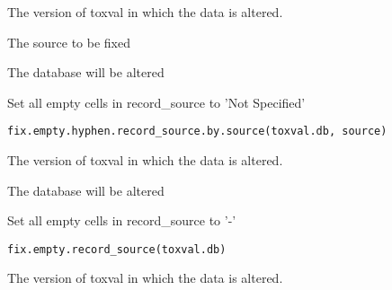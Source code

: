 \documentclass[letterpaper]{book}
\begin{document}
%
\begin{Arguments}
\begin{ldescription}
\item[\code{toxval.db}] The version of toxval in which the data is altered.

\item[\code{source}] The source to be fixed
\end{ldescription}
\end{Arguments}
%
\begin{Value}
The database will be altered
\end{Value}
%
\begin{Description}\relax
Set all empty cells in record\_source to 'Not Specified'
\end{Description}
%
\begin{Usage}
\begin{verbatim}
fix.empty.hyphen.record_source.by.source(toxval.db, source)
\end{verbatim}
\end{Usage}
%
\begin{Arguments}
\begin{ldescription}
\item[\code{toxval.db}] The version of toxval in which the data is altered.
\end{ldescription}
\end{Arguments}
%
\begin{Value}
The database will be altered
\end{Value}
%
\begin{Description}\relax
Set all empty cells in record\_source to '-'
\end{Description}
%
\begin{Usage}
\begin{verbatim}
fix.empty.record_source(toxval.db)
\end{verbatim}
\end{Usage}
%
\begin{Arguments}
\begin{ldescription}
\item[\code{toxval.db}] The version of toxval in which the data is altered.
\end{ldescription}
\end{Arguments}
\end{document}
